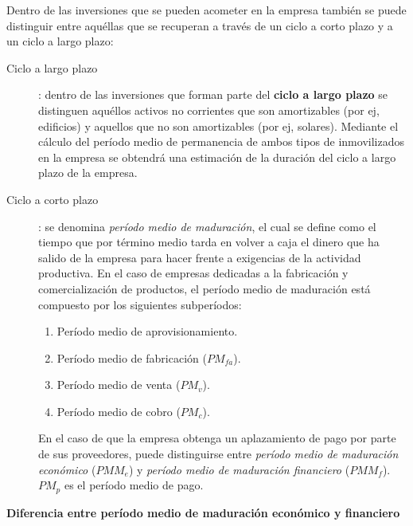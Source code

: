 \documentclass[10pt,a4paper,spanish]{report}
\begin{document}
            Dentro de las inversiones que se pueden acometer en la empresa también se puede distinguir entre aquéllas que se recuperan a través de un ciclo a corto plazo y a un ciclo a largo plazo:
            \begin{description}
                \item[Ciclo a largo plazo]: dentro de las inversiones que forman parte del \textbf{ciclo a largo plazo} se distinguen aquéllos activos no corrientes que son amortizables (por ej, edificios) y aquellos que no son amortizables (por ej, solares). Mediante el cálculo del período medio de permanencia de ambos tipos de inmovilizados en la empresa se obtendrá una estimación de la duración del ciclo a largo plazo de la empresa.

                \item[Ciclo a corto plazo]: se denomina \textit{\textcolor[rgb]{0.4,0.7,0.4}{período medio de maduración}}, el cual se define como el tiempo que por término medio tarda en volver a caja el dinero que ha salido de la empresa para hacer frente a exigencias de la actividad productiva. En el caso de empresas dedicadas a la fabricación y comercialización de productos, el período medio de maduración está compuesto por los siguientes subperíodos:
                \begin{enumerate}
                    \item Período medio de aprovisionamiento.
                    \item Período medio de fabricación ($PM_{fa}$).
                    \item Período medio de venta ($PM_{v}$).
                    \item Período medio de cobro ($PM_{c}$).
                \end{enumerate}
                En el caso de que la empresa obtenga un aplazamiento de pago por parte de sus proveedores, puede distinguirse entre \textit{\textcolor[rgb]{0.4,0.7,0.4}{período medio de maduración económico}} ($PMM_{e}$) y \textit{\textcolor[rgb]{0.4,0.7,0.4}{período medio de maduración financiero}} ($PMM_{f}$). $PM_{p}$ es el período medio de pago.
            \end{description}
            \begin{center}
                \textbf{Diferencia entre período medio de maduración económico y financiero} \\
                 \par
                 \par
            \end{center}
        \newpage      
\end{document}
